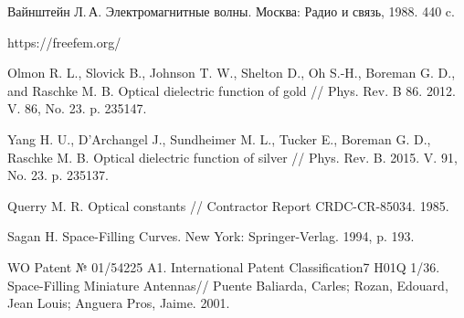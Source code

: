 \documentclass[%
specialist,  %
subf,        %
href,        %
colorlinks,  %
]{disser}
\begin{document}
\begin{thebibliography}{99}
	Вайнштейн Л.\,А. {Электромагнитные волны}. Москва: Радио и связь, 1988. 440 c.
	
 https://freefem.org/
	
 Olmon R. L., Slovick B., Johnson T. W., Shelton D., Oh S.-H., Boreman G. D., and Raschke M. B. Optical dielectric function of gold // Phys. Rev. B 86. 2012. V. 86, No. 23. p. 235147.
	
 Yang H. U., D'Archangel J., Sundheimer M. L., Tucker E., Boreman G. D., Raschke M. B. Optical dielectric function of silver // Phys. Rev. B. 2015. V. 91, No. 23. p. 235137.
	
 Querry M. R. Optical constants //  Contractor Report CRDC-CR-85034. 1985.
	
 Sagan H. Space-Filling Curves. New York: Springer-Verlag. 1994, p. 193.

 WO Patent № 01/54225 A1. International Patent Classification7 H01Q 1/36. Space-Filling Miniature Antennas// Puente Baliarda, Carles; Rozan, Edouard, Jean Louis; Anguera Pros, Jaime. 2001.
	
\end{thebibliography}
\end{document}
